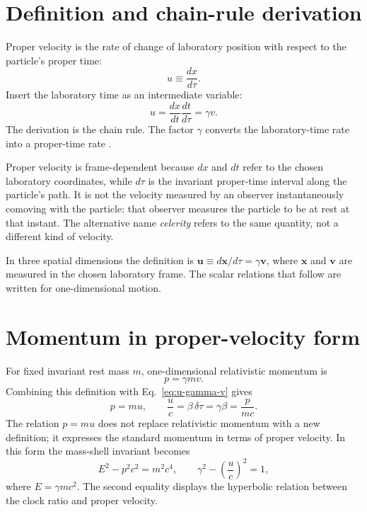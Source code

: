 \documentclass[12pt]{article}
\begin{document}
\section{Definition and chain-rule derivation}
\label{sec:definition}

Proper velocity is the rate of change of laboratory position with respect to the particle's proper time:
\begin{equation}
  u\equiv\frac{dx}{d\tau}.
  \label{eq:u-definition}
\end{equation}
Insert the laboratory time as an intermediate variable:
\begin{equation}
  u=\frac{dx}{dt}\frac{dt}{d\tau}=\gamma v.
  \label{eq:u-gamma-v}
\end{equation}
The derivation is the chain rule. The factor $\gamma$ converts the laboratory-time rate into a proper-time rate \cite{Tong}.

Proper velocity is frame-dependent because $dx$ and $dt$ refer to the chosen laboratory coordinates, while $d\tau$ is the invariant proper-time interval along the particle's path. It is not the velocity measured by an observer instantaneously comoving with the particle: that observer measures the particle to be at rest at that instant. The alternative name \emph{celerity} refers to the same quantity, not a different kind of velocity.

In three spatial dimensions the definition is $\mathbf u\equiv d\mathbf x/d\tau=\gamma\mathbf v$, where $\mathbf x$ and $\mathbf v$ are measured in the chosen laboratory frame. The scalar relations that follow are written for one-dimensional motion.

\section{Momentum in proper-velocity form}
\label{sec:momentum}

For fixed invariant rest mass $m$, one-dimensional relativistic momentum is
\begin{equation}
  p=\gamma mv.
  \label{eq:momentum}
\end{equation}
Combining this definition with Eq.~\eqref{eq:u-gamma-v} gives
\begin{equation}
  p=mu,
  \qquad
  \frac{u}{c}=\beta\,\delta\tau=\gamma\beta=\frac{p}{mc}.
  \label{eq:momentum-u}
\end{equation}
The relation $p=mu$ does not replace relativistic momentum with a new definition; it expresses the standard momentum in terms of proper velocity. In this form the mass-shell invariant becomes
\begin{equation}
  E^2-p^2c^2=m^2c^4,
  \qquad
  \gamma^2-\left(\frac{u}{c}\right)^2=1,
  \label{eq:mass-shell-u}
\end{equation}
where $E=\gamma mc^2$. The second equality displays the hyperbolic relation between the clock ratio and proper velocity.
\end{document}
